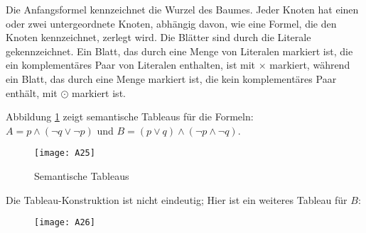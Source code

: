 Die Anfangsformel kennzeichnet die Wurzel des Baumes. Jeder Knoten hat einen oder zwei untergeordnete Knoten, abhängig davon, wie eine Formel, die den Knoten kennzeichnet, zerlegt wird. Die Blätter sind durch die Literale gekennzeichnet. Ein Blatt, das durch eine Menge von Literalen markiert ist, die ein komplementäres Paar von Literalen enthalten, ist mit $\times$ markiert, während ein Blatt, das durch eine Menge markiert ist, die kein komplementäres Paar enthält, mit $\odot$ markiert ist.

Abbildung \ref{Abb. 2.7} zeigt semantische Tableaus für die Formeln:\\
$A = p\wedge (\neg q \vee \neg p)$ und $B = (p \vee q) \wedge  (\neg p \wedge  \neg q)$.

\begin{figure}[ !h] \centering											
\texttt{[image: A25]}
\caption[Semantische Tableaus]{Semantische Tableaus}
\label{Abb. 2.7}
\end{figure}

Die Tableau-Konstruktion ist nicht eindeutig; Hier ist ein weiteres Tableau für $B$:

\begin{figure}[ !h] \centering												
 \texttt{[image: A26]}	
 \label{Abb. A26}
\end{figure}


